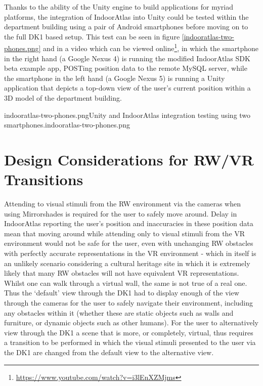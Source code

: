 Thanks to the ability of the Unity engine to build applications for myriad platforms, the integration of IndoorAtlas into Unity could be tested within the department building using a pair of Android smartphones before moving on to the full DK1 based setup. This test can be seen in figure \ref{indooratlas-two-phones.png} and in a video which can be viewed online\footnote{\url{https://www.youtube.com/watch?v=i3lEnXZMjms}}, in which the smartphone in the right hand (a Google Nexus 4) is running the modified IndoorAtlas SDK beta example app, POSTing position data to the remote MySQL server, while the smartphone in the left hand (a Google Nexus 5) is running a Unity application that depicts a top-down view of the user's current position within a 3D model of the department building.

	   {indooratlas-two-phones.png}{Unity and IndoorAtlas integration testing using two smartphones.}{indooratlas-two-phones.png}
       

\clearpage

\section{Design Considerations for RW/VR Transitions}
\label{design-considerations-for-rw-vr-transitions}
Attending to visual stimuli from the RW environment via the cameras when using Mirrorshades is required for the user to safely move around. Delay in IndoorAtlas reporting the user's position and inaccuracies in these position data mean that moving around while attending only to visual stimuli from the VR environment would not be safe for the user, even with unchanging RW obstacles with perfectly accurate representations in the VR environment - which in itself is an unlikely scenario considering a cultural heritage site in which it is extremely likely that many RW obstacles will not have equivalent VR representations. Whilst one can walk through a virtual wall, the same is not true of a real one. Thus the `default' view through the DK1 had to display enough of the view through the cameras for the user to safely navigate their environment, including any obstacles within it (whether these are static objects such as walls and furniture, or dynamic objects such as other humans). For the user to alternatively view through the DK1 a scene that is more, or completely, virtual, thus requires a transition to be performed in which the visual stimuli presented to the user via the DK1 are changed from the default view to the alternative view.

